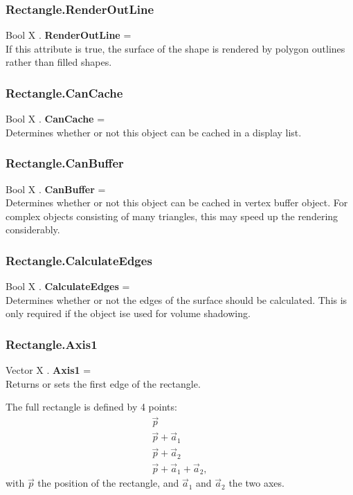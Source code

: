 \documentclass[10pt]{book}
\begin{document}
\subsubsection{Rectangle.RenderOutLine \label{F:Rectangle:RenderOutLine}}
Bool X . \textbf{RenderOutLine} = \\
If this attribute is true, the surface of the shape is rendered by polygon outlines rather than filled shapes.

\subsubsection{Rectangle.CanCache \label{F:Rectangle:CanCache}}
Bool X . \textbf{CanCache} = \\
Determines whether or not this object can be cached in a display list.

\subsubsection{Rectangle.CanBuffer \label{F:Rectangle:CanBuffer}}
Bool X . \textbf{CanBuffer} = \\
Determines whether or not this object can be cached in vertex buffer object. For complex objects consisting of many triangles, this may speed up the rendering considerably.

\subsubsection{Rectangle.CalculateEdges \label{F:Rectangle:CalculateEdges}}
Bool X . \textbf{CalculateEdges} = \\
Determines whether or not the edges of the surface should be calculated. This is only required if the object ise used for volume shadowing.

\subsubsection{Rectangle.Axis1 \label{F:Rectangle:Axis1}}
Vector X . \textbf{Axis1} = \\
Returns or sets the first edge of the rectangle.

The full rectangle is defined by 4 points:
\begin{equation}
\begin{array}{l}
\vec{p} \\
\vec{p} + \vec{a}_1 \\
\vec{p} + \vec{a}_2 \\
\vec{p} + \vec{a}_1 + \vec{a}_2, 
\end{array}
\end{equation}
with $\vec{p}$ the position of the rectangle, and $\vec{a}_1$ and $\vec{a}_2$ the two axes.
\end{document}
